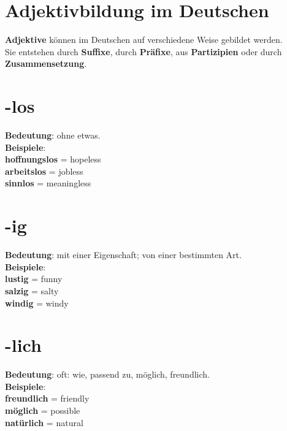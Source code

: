 \documentclass[a4paper]{article}
\title{}
\date{}
\begin{document}
    \maketitle
    
    
    \section{Adjektivbildung im Deutschen}
        \textbf{Adjektive} k\"onnen im Deutschen auf verschiedene Weise gebildet werden.\\
        Sie entstehen durch \textbf{Suffixe}, durch \textbf{Pr\"afixe}, aus \textbf{Partizipien} oder durch \textbf{Zusammensetzung}.\\
    
    
    \section{-los}
        \textbf{Bedeutung}: ohne etwas.\\
        \textbf{Beispiele}:\\
        \textbf{hoffnungslos} = hopeless\\
        \textbf{arbeitslos} = jobless\\
        \textbf{sinnlos} = meaningless\\
    
    
    \section{-ig}
        \textbf{Bedeutung}: mit einer Eigenschaft; von einer bestimmten Art.\\
        \textbf{Beispiele}:\\
        \textbf{lustig} = funny\\
        \textbf{salzig} = salty\\
        \textbf{windig} = windy\\
    
    
    \section{-lich}
        \textbf{Bedeutung}: oft: wie, passend zu, m\"oglich, freundlich.\\
        \textbf{Beispiele}:\\
        \textbf{freundlich} = friendly\\
        \textbf{m\"oglich} = possible\\
        \textbf{nat\"urlich} = natural\\
    
\end{document}
